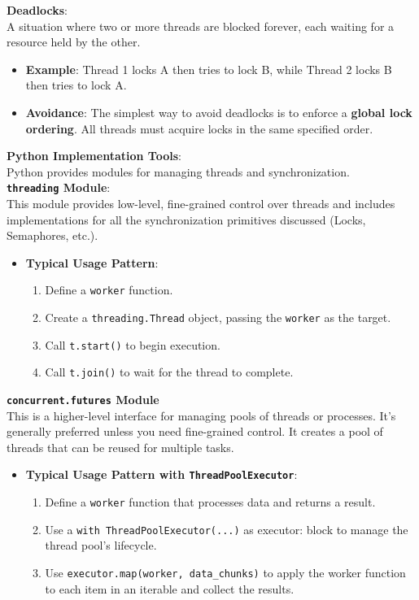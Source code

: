 \documentclass[10pt, a4paper]{article}
\begin{document}
\begin{multicols}{3}
\textbf{Deadlocks}: \\
A situation where two or more threads are blocked forever, each waiting for a resource held by the other.
\begin{itemize}[nosep] %
    \item \textbf{Example}: Thread 1 locks A then tries to lock B, while Thread 2 locks B then tries to lock A.
    \item \textbf{Avoidance}: The simplest way to avoid deadlocks is to enforce a \textbf{global lock ordering}. All threads must acquire locks in the same specified order.
\end{itemize}
\textbf{Python Implementation Tools}: \\
Python provides modules for managing threads and synchronization. \\
\textbf{\texttt{threading} Module}: \\
This module provides low-level, fine-grained control over threads and includes implementations for all the synchronization primitives discussed (Locks, Semaphores, etc.).
\begin{itemize}[nosep] %
    \item \textbf{Typical Usage Pattern}:
    \begin{enumerate}[nosep] %
        \item Define a \texttt{worker} function.
        \item Create a \texttt{threading.Thread} object, passing the \texttt{worker} as the target.
        \item Call \texttt{t.start()} to begin execution.
        \item Call \texttt{t.join()} to wait for the thread to complete.
    \end{enumerate}
\end{itemize}
\textbf{\texttt{concurrent.futures} Module} \\
This is a higher-level interface for managing pools of threads or processes. It's generally preferred unless you need fine-grained control. It creates a pool of threads that can be reused for multiple tasks.
\begin{itemize}[nosep] %
    \item \textbf{Typical Usage Pattern with \texttt{ThreadPoolExecutor}}:
    \begin{enumerate}[nosep] %
        \item Define a \texttt{worker} function that processes data and returns a result.
        \item Use a \texttt{with ThreadPoolExecutor(...)} as executor: block to manage the thread pool's lifecycle.
        \item Use \texttt{executor.map(worker, data\_chunks)} to apply the worker function to each item in an iterable and collect the results.
    \end{enumerate}
\end{itemize}


\end{multicols}
\end{document}
